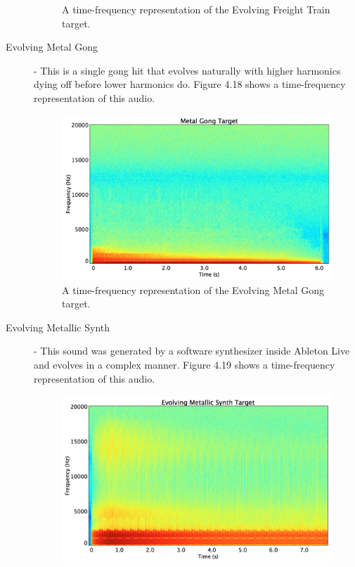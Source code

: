 \documentclass[12pt]{report} 	%
\numberwithin{figure}{chapter}
\numberwithin{table}{chapter}
\numberwithin{equation}{chapter}
\begin{document}
\begin{flushleft}
\begin{description}
\begin{figure}[h!]
\begin{center}
\caption[Evolving freight train time-frequency representation]{A time-frequency representation of the Evolving Freight Train target.}
\end{center}
\end{figure}
\item[Evolving Metal Gong] - This is a single gong hit that evolves naturally with higher harmonics dying off before lower harmonics do. Figure 4.18 shows a time-frequency representation of this audio.
\begin{figure}[h!]
\begin{center}
\includegraphics[scale=0.35,width=\linewidth]{MetalGongTargetSTFT}
\caption[Evolving metal gong time-frequency representation]{A time-frequency representation of the Evolving Metal Gong target.}
\end{center}
\end{figure}
\item[Evolving Metallic Synth] - This sound was generated by a software synthesizer inside Ableton Live and evolves in a complex manner. Figure 4.19 shows a time-frequency representation of this audio.
\begin{figure}[h!]
\begin{center}
\includegraphics[scale=0.35,width=\linewidth]{EvolvingMetallicSynthTargetSTFT}

\end{center}
\end{figure}
\end{description}
\end{flushleft}
\end{document}
